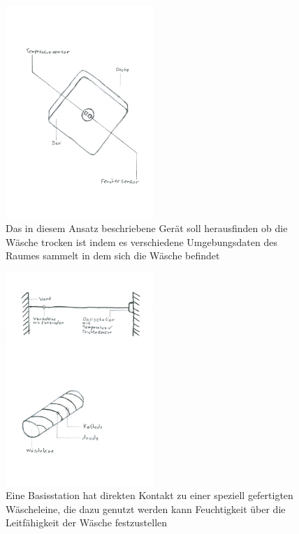 \begin{figure}[htb] 
	\centerline{\includegraphics*[width=0.5\textwidth]{./10+10/Concept/02-extern}}
	\caption{Das in diesem Ansatz beschriebene Gerät soll herausfinden ob die Wäsche trocken ist indem es verschiedene Umgebungsdaten des Raumes sammelt in dem sich die Wäsche befindet}
	\label{10+10_extern}
\end{figure}
\begin{figure}[htb] 
	\centerline{\includegraphics*[width=0.5\textwidth]{./10+10/Concept/03-leine}}
	\caption{Eine Basisstation hat direkten Kontakt zu einer speziell gefertigten Wäscheleine, die dazu genutzt werden kann Feuchtigkeit über die Leitfähigkeit der Wäsche festzustellen}
	\label{10+10_leine}
\end{figure}
